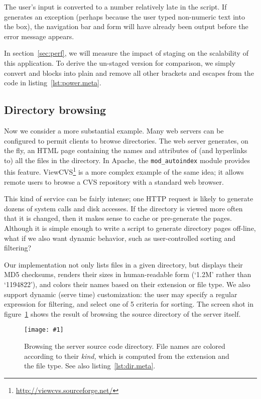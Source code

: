\documentclass[preprint]{acm_proc_article-sp}
\newcommand{\myfig}[3]{%
  \begin{figure}[tbp]%
    #3%
    \caption{#2}%
    \label{fig:#1}%
  \end{figure}}
\newcommand{\screenshot}[2]{%
  \myfig{#1}{#2}
  {\centering%
    \texttt{[image: \#1]}}}
\newcounter{listing}
\begin{document}
The user's input is converted to a number relatively late in the
script.  If  generates an exception (perhaps
because the user typed non-numeric text into the box), the navigation
bar and form will have already been output before the error message
appears.

In section~\ref{sec:perf}, we will measure the impact of staging on
the scalability of this application.  To derive the un-staged version
for comparison, we simply convert \cd{\Mquote{\Mtilde}} and
\cd{\Mquote{!}} blocks into plain \cd{\Mquote{}} and remove all other
brackets and escapes from the code in listing~\ref{lst:power.meta}.

\subsection{Directory browsing}
\label{sec:eg:browse}

Now we consider a more substantial example.
Many web servers can be configured to permit clients to browse
directories.  The web server generates, on the fly, an HTML page
containing the names and attributes of (and hyperlinks to) all
the files in the directory.  In Apache, the
\texttt{mod\_autoindex} module provides this feature.
ViewCVS\footnote{\url{http://viewcvs.sourceforge.net/}} is a more
complex example of the same idea; it allows remote users to browse a
CVS repository with a standard web browser.

This kind of service can be fairly intense; one HTTP request is likely
to generate dozens of system calls and disk accesses.  If the
directory is viewed more often that it is changed, then it makes sense
to cache or pre-generate the pages.  Although it is simple enough to
write a script to generate directory pages off-line, what if we also
want dynamic behavior, such as user-controlled sorting and filtering?

Our implementation not only lists files in a given directory, but
displays their MD5 checksums, renders their sizes in human-readable
form (`1.2M' rather than `1194822'), and colors their names based on
their extension or file type.  We also support dynamic (serve time)
customization: the user may specify a regular expression for
filtering, and select one of 5 criteria for sorting.  The screen shot
in figure~\ref{fig:server-dir} shows the result of browsing the source
directory of the server itself.

\screenshot{server-dir}{Browsing the server source code directory.
  File names are colored according to their \emph{kind,} which is
  computed from the extension and the file type.  See also
  listing~\ref{lst:dir.meta}.}
\end{document}
